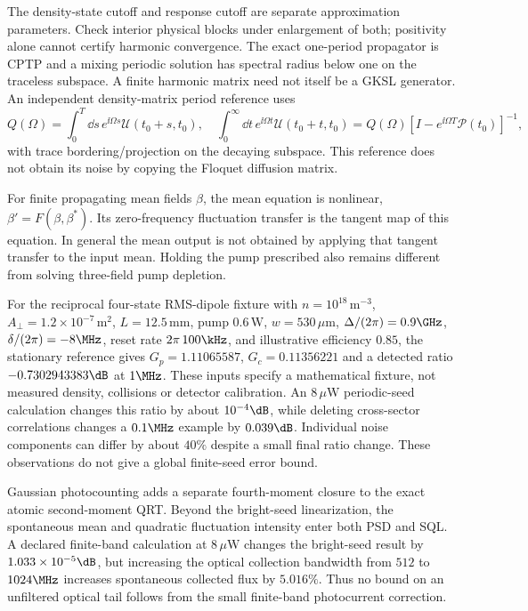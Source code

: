 The density-state cutoff and response cutoff are separate approximation
parameters. Check interior physical blocks under enlargement of both; positivity
alone cannot certify harmonic convergence. The exact one-period propagator is
CPTP and a mixing periodic solution has spectral radius below one on the
traceless subspace. A finite harmonic matrix need not itself be a GKSL
generator. An independent density-matrix period reference uses
\begin{equation}
 Q(\Omega)=\int_0^T\dd s\,e^{\ii\Omega s}\mathcal U(t_0+s,t_0),\quad
 \int_0^\infty\dd t\,e^{\ii\Omega t}\mathcal U(t_0+t,t_0)
 =Q(\Omega)[I-e^{\ii\Omega T}\mathcal P(t_0)]^{-1},
 \label{eq:gc-period-qrt}
\end{equation}
with trace bordering/projection on the decaying subspace. This reference does
not obtain its noise by copying the Floquet diffusion matrix.

For finite propagating mean fields $\beta$, the mean equation is nonlinear,
$\beta'=F(\beta,\beta^*)$. Its zero-frequency fluctuation transfer is the
tangent map of this equation. In general the mean output is not obtained by
applying that tangent transfer to the input mean. Holding the pump prescribed
also remains different from solving three-field pump depletion.

For the reciprocal four-state RMS-dipole fixture with
$n=10^{18}\,\mathrm{m}^{-3}$, $A_\perp=1.2\times10^{-7}\,\mathrm{m}^2$,
$L=12.5\,\mathrm{mm}$, pump $0.6\,\mathrm W$, $w=530\,\mu\mathrm m$,
$\Delta/(2\pi)=0.9\GHz$, $\delta/(2\pi)=-8\MHz$,
reset rate $2\pi\,100\kHz$, and illustrative efficiency $0.85$, the
stationary reference gives $G_p=1.11065587$, $G_c=0.11356221$ and a detected
ratio $-0.7302943383\dB$ at $1\MHz$. These inputs specify a mathematical
fixture, not measured density, collisions or detector calibration.
An $8\,\mu\mathrm W$ periodic-seed calculation changes this ratio by about
$10^{-4}\dB$, while deleting cross-sector correlations changes a $0.1\MHz$
example by $0.039\dB$. Individual noise components can differ by about
$40\%$ despite a small final ratio change. These observations do not give a
global finite-seed error bound.

Gaussian photocounting adds a separate fourth-moment closure to the exact
atomic second-moment QRT. Beyond the bright-seed linearization, the spontaneous
mean and quadratic fluctuation intensity enter both PSD and SQL. A declared
finite-band calculation at $8\,\mu\mathrm W$ changes the bright-seed result
by $1.033\times10^{-5}\dB$, but increasing the optical collection bandwidth
from $512$ to $1024\MHz$ increases spontaneous collected flux by $5.016\%$.
Thus no bound on an unfiltered optical tail follows from the small finite-band
photocurrent correction.

